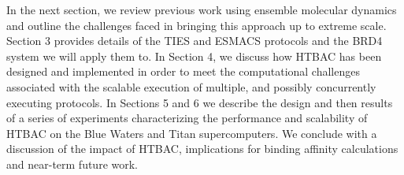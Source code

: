 
In the next section, we review previous work using ensemble molecular dynamics
and outline the challenges faced in bringing this approach up to extreme
scale. Section 3 provides details of the TIES and ESMACS protocols and the
BRD4 system we will apply them to. In Section 4, we discuss how HTBAC has
been designed and implemented in order to meet the computational challenges
associated with the scalable execution of multiple, and possibly concurrently
executing protocols. In Sections 5 and 6 we describe the design and then
results of a series of experiments characterizing the performance and
scalability of HTBAC on the Blue Waters and Titan supercomputers. We conclude
with a discussion of the impact of HTBAC, implications for binding affinity
calculations and near-term future work.
